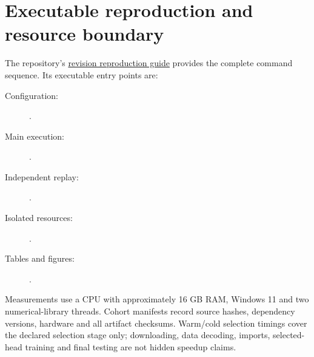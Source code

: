 \documentclass[11pt]{article}
\begin{document}
\section{Executable reproduction and resource boundary}
The repository's \href{https://github.com/AnkitGuin/Task-Dependent-VIT-Patch-Loss/blob/main/docs/selection_revision_reproducibility.md}{revision reproduction guide} provides the complete command sequence. Its executable entry points are:
\begin{description}
\item[Configuration:] .
\item[Main execution:] .
\item[Independent replay:] .
\item[Isolated resources:] .
\item[Tables and figures:] .
\end{description}
Measurements use a \RevHardware{} CPU with approximately 16 GB RAM, Windows 11 and two numerical-library threads. Cohort manifests record source hashes, dependency versions, hardware and all artifact checksums. Warm/cold selection timings cover the declared selection stage only; downloading, data decoding, imports, selected-head training and final testing are not hidden speedup claims.
\clearpage


\end{document}
